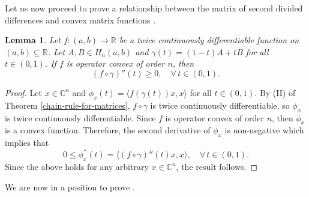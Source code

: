 \documentclass[12pt,a4paper]{amsart}
\newtheorem{lemma}[theorem]{Lemma}
\theoremstyle{definition}
\newcommand{\myinnerproduct}[2]{ \langle #1, #2 \rangle }
\begin{document}
	Let us now proceed to prove a relationship between the matrix of second divided differences and convex matrix functions \cite[Page 544]{horn-book}. 
	
	\begin{lemma}\label{lemma-for-second-difference}
		Let $f:(a, b) \rightarrow \mathbb{R}$ be a twice continuously differentiable function on $(a, b) \subseteq \mathbb{R}$. Let $A, B \in H_n(a, b)$ and $\gamma(t) = (1-t)A + tB$ for all $t \in (0,1)$. If $f$ is operator convex of order $n$, then
		\[  (f \circ \gamma)''(t) \geq 0, \quad \forall \, t \in (0,1).  \]
	\end{lemma}
	\begin{proof}
		Let $x \in \mathbb{C}^{n}$ and $\phi_x(t) = \myinnerproduct{f(\gamma(t))x}{x}$ for all $t \in (0,1)$. By (II) of Theorem \ref{chain-rule-for-matrices}, $f \circ \gamma$ is twice continuously differentiable, so $\phi_x$ is twice continuously differentiable. Since $f$ is operator convex of order $n$, then $\phi_x$ is a convex function. Therefore, the second derivative of $\phi_x$ is non-negative which implies that
		\begin{equation*}
			0 \leq \phi_x^{''}(t) = \bigg\langle (f \circ \gamma)''(t) x, x \bigg\rangle, \quad \forall \, t \in (0,1).
		\end{equation*}
		Since the above holds for any arbitrary $x \in \mathbb{C}^{n}$, the result follows.
	\end{proof}
	
	We are now in a position to prove \cite[Theorem 6.6.52 (1)]{horn-book}.
	
\end{document}

